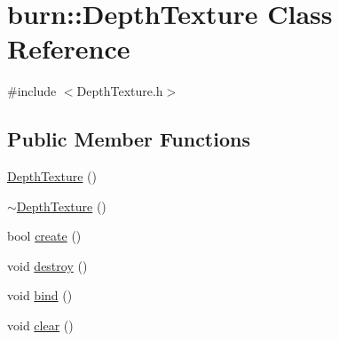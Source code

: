 \hypertarget{classburn_1_1_depth_texture}{\section{burn\-:\-:Depth\-Texture Class Reference}
\label{classburn_1_1_depth_texture}
}


{\ttfamily \#include $<$Depth\-Texture.\-h$>$}

\subsection*{Public Member Functions}
\begin{DoxyCompactItemize}
\item 
\hyperlink{classburn_1_1_depth_texture_ada3d93809bc75574969c6137c83d86c3}{Depth\-Texture} ()
\item 
\hyperlink{classburn_1_1_depth_texture_a30a2d259ea1ec8d804fc4d611ea4a12b}{$\sim$\-Depth\-Texture} ()
\item 
bool \hyperlink{classburn_1_1_depth_texture_a9ac3058e23297d8c1c036cac29fbba0f}{create} ()
\item 
void \hyperlink{classburn_1_1_depth_texture_a800b41d9c6193bb6418521354a937f37}{destroy} ()
\item 
void \hyperlink{classburn_1_1_depth_texture_af3d8d3bb3c50fce2c60c5a7c4339bff0}{bind} ()
\item 
void \hyperlink{classburn_1_1_depth_texture_a5c18c6b5e87f01778bdbf2a59fb47c53}{clear} ()
\end{DoxyCompactItemize}


